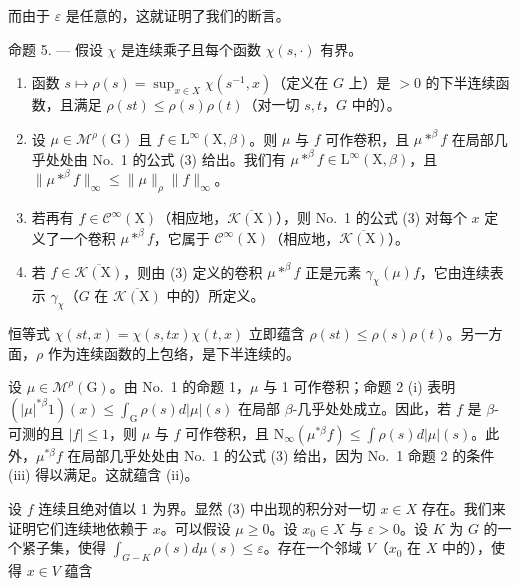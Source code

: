 而由于 \(\varepsilon\) 是任意的，这就证明了我们的断言。

命题 5. --- 假设 \(\chi\) 是连续乘子且每个函数 \(\chi(s,\cdot)\) 有界。

\begin{enumerate}
\def\labelenumi{(\roman{enumi})}
\item
  函数 \(s \mapsto \rho(s) = \sup_{x \in X} \chi(s^{-1}, x)\)（定义在 \(G\) 上）是 \(> 0\) 的下半连续函数，且满足 \(\rho(st) \leqslant \rho(s)\rho(t)\)（对一切 \(s, t\)，\(G\) 中的）。
\item
  设 \(\mu \in \mathcal{M}^{\rho}(\mathrm{G})\) 且 \(f \in \mathrm{L}^{\infty}(\mathrm{X},\beta)\)。则 \(\mu\) 与 \(f\) 可作卷积，且 \(\mu *^{\beta} f\) 在局部几乎处处由 No.~1 的公式 (3) 给出。我们有 \(\mu *^{\beta} f \in \mathrm{L}^{\infty}(\mathrm{X},\beta)\)，且 \(\| \mu *^{\beta} f \|_{\infty} \leqslant \| \mu \|_{\rho} \| f \|_{\infty}\)。
\item
  若再有 \(f \in \mathcal{C}^{\infty}(\mathrm{X})\)（相应地，\(\overline{\mathcal{K}(\mathrm{X})}\)），则 No.~1 的公式 (3) 对每个 \(x\) 定义了一个卷积 \(\mu *^{\beta}f\)，它属于 \(\mathcal{C}^{\infty}(\mathrm{X})\)（相应地，\(\overline{\mathcal{K}(\mathrm{X})}\)）。
\item
  若 \(f \in \overline{\mathcal{K}(\mathrm{X})}\)，则由 (3) 定义的卷积 \(\mu *^{\beta}f\) 正是元素 \(\gamma_{\chi}(\mu)f\)，它由连续表示 \(\gamma_{\chi}\)（\(G\) 在 \(\overline{\mathcal{K}(\mathrm{X})}\) 中的）所定义。
\end{enumerate}

恒等式 \(\chi(st,x) = \chi(s,tx)\chi(t,x)\) 立即蕴含 \(\rho(st) \leqslant \rho(s)\rho(t)\)。另一方面，\(\rho\) 作为连续函数的上包络，是下半连续的。

设 \(\mu \in \mathcal{M}^{\rho}(\mathrm{G})\)。由 No.~1 的命题 1，\(\mu\) 与 1 可作卷积；命题 2 (i) 表明 \((|\mu|^{*\beta}1)(x) \leqslant \int_{\mathrm{G}} \rho(s)d|\mu|(s)\) 在局部 \(\beta\)-几乎处处成立。因此，若 \(f\) 是 \(\beta\)-可测的且 \(|f| \leqslant 1\)，则 \(\mu\) 与 \(f\) 可作卷积，且 \(\mathrm{N}_{\infty}(\mu^{*\beta}f) \leqslant \int \rho(s)d|\mu|(s)\)。此外，\(\mu^{*\beta}f\) 在局部几乎处处由 No.~1 的公式 (3) 给出，因为 No.~1 命题 2 的条件 (iii) 得以满足。这就蕴含 (ii)。

设 \(f\) 连续且绝对值以 1 为界。显然 (3) 中出现的积分对一切 \(x \in X\) 存在。我们来证明它们连续地依赖于 \(x\)。可以假设 \(\mu \geqslant 0\)。设 \(x_0 \in X\) 与 \(\varepsilon > 0\)。设 \(K\) 为 \(G\) 的一个紧子集，使得 \(\int_{G - K} \rho(s) d\mu(s) \leqslant \varepsilon\)。存在一个邻域 \(V\)（\(x_0\) 在 \(X\) 中的），使得 \(x \in V\) 蕴含

